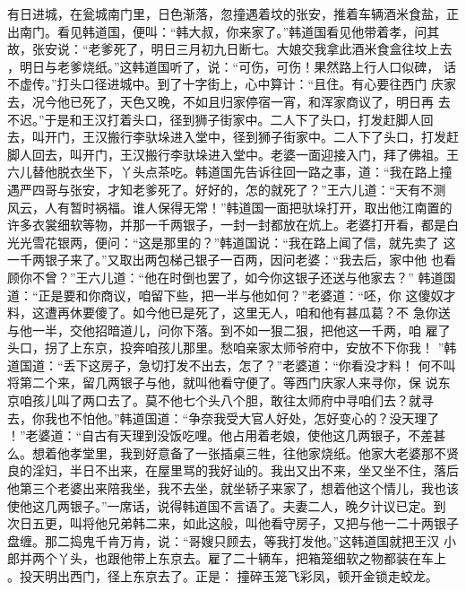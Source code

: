 有日进城，在瓮城南门里，日色渐落，忽撞遇着坟的张安，推着车辆酒米食盐，正
出南门。看见韩道国，便叫：“韩大叔，你来家了。”韩道国看见他带着孝，问其
故，张安说：“老爹死了，明日三月初九日断七。大娘交我拿此酒米食盒往坟上去
，明日与老爹烧纸。”这韩道国听了，说：“可伤，可伤！果然路上行人口似碑，
话不虚传。”打头口径进城中。到了十字街上，心中算计：“且住。有心要往西门
庆家去，况今他已死了，天色又晚，不如且归家停宿一宵，和浑家商议了，明日再
去不迟。”于是和王汉打着头口，径到狮子街家中。二人下了头口，打发赶脚人回
去，叫开门，王汉搬行李驮垛进入堂中，径到狮子街家中。二人下了头口，打发赶
脚人回去，叫开门，王汉搬行李驮垛进入堂中。老婆一面迎接入门，拜了佛祖。王
六儿替他脱衣坐下，丫头点茶吃。韩道国先告诉往回一路之事，道：“我在路上撞
遇严四哥与张安，才知老爹死了。好好的，怎的就死了？”王六儿道：“天有不测
风云，人有暂时祸福。谁人保得无常！”韩道国一面把驮垛打开，取出他江南置的
许多衣裳细软等物，并那一千两银子，一封一封都放在炕上。老婆打开看，都是白
光光雪花银两，便问：“这是那里的？”韩道国说：“我在路上闻了信，就先卖了
这一千两银子来了。”又取出两包梯己银子一百两，因问老婆：“我去后，家中他
也看顾你不曾？”王六儿道：“他在时倒也罢了，如今你这银子还送与他家去？”
韩道国道：“正是要和你商议，咱留下些，把一半与他如何？”老婆道：“呸，你
这傻奴才料，这遭再休要傻了。如今他已是死了，这里无人，咱和他有甚瓜葛？不
急你送与他一半，交他招暗道儿，问你下落。到不如一狠二狠，把他这一千两，咱
雇了头口，拐了上东京，投奔咱孩儿那里。愁咱亲家太师爷府中，安放不下你我！
”韩道国道：“丢下这房子，急切打发不出去，怎了？”老婆道：“你看没才料！
何不叫将第二个来，留几两银子与他，就叫他看守便了。等西门庆家人来寻你，保
说东京咱孩儿叫了两口去了。莫不他七个头八个胆，敢往太师府中寻咱们去？就寻
去，你我也不怕他。”韩道国道：“争奈我受大官人好处，怎好变心的？没天理了
！”老婆道：“自古有天理到没饭吃哩。他占用着老娘，使他这几两银子，不差甚
么。想着他孝堂里，我到好意备了一张插桌三牲，往他家烧纸。他家大老婆那不贤
良的淫妇，半日不出来，在屋里骂的我好讪的。我出又出不来，坐又坐不住，落后
他第三个老婆出来陪我坐，我不去坐，就坐轿子来家了，想着他这个情儿，我也该
使他这几两银子。”一席话，说得韩道国不言语了。夫妻二人，晚夕计议已定。到
次日五更，叫将他兄弟韩二来，如此这般，叫他看守房子，又把与他一二十两银子
盘缠。那二捣鬼千肯万肯，说：“哥嫂只顾去，等我打发他。”这韩道国就把王汉
小郎并两个丫头，也跟他带上东京去。雇了二十辆车，把箱笼细软之物都装在车上
。投天明出西门，径上东京去了。正是：
撞碎玉笼飞彩凤，顿开金锁走蛟龙。

